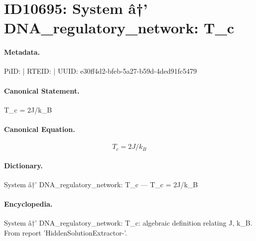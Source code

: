 \section*{ID10695: System â†’ DNA\_regulatory\_network: T\_c}
\paragraph{Metadata.}
PiID:  | RTEID:  | UUID: e30ff4d2-bfeb-5a27-b59d-4ded91fc5479

\paragraph{Canonical Statement.}
T\_c = 2J/k\_B

\paragraph{Canonical Equation.}
\[
T_c = 2J/k_B
\]

\paragraph{Dictionary.}
System â†’ DNA\_regulatory\_network: T\_c — T\_c = 2J/k\_B

\paragraph{Encyclopedia.}
System â†’ DNA\_regulatory\_network: T\_c: algebraic definition relating J, k\_B. From report 'HiddenSolutionExtractor-'.

